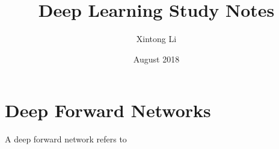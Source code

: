 \documentclass{article}
\title{Deep Learning Study Notes}
\author{Xintong Li}
\date{August 2018}
\begin{document}
\maketitle

\section{Deep Forward Networks}

A deep forward network refers to 
\end{document}
